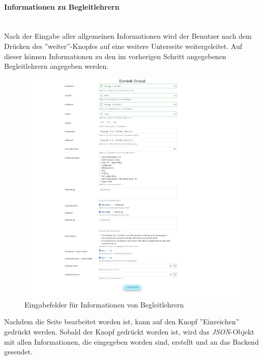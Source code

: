 \paragraph{Informationen zu Begleitlehrern}~
\label{code_submit_data}~\\
Nach der Eingabe aller allgemeinen Informationen wird der Benutzer nach dem Drücken des ''weiter''-Knopfes auf eine weitere Unterseite weitergeleitet. Auf dieser können Informationen zu den im vorherigen Schritt angegebenen Begleitlehrern angegeben werden.
\begin{figure}[H]
	\centering
	\includegraphics[width=0.7\linewidth]{images/escorts}
	\caption[Schulveranstaltung 2]{Eingabefelder für Informationen von Begleitlehrern}
	\label{fig:escorts}
\end{figure}
\newpage
Nachdem die Seite bearbeitet worden ist, kann auf den Knopf ''Einreichen'' gedrückt werden. Sobald der Knopf gedrückt worden ist, wird das \textit{JSON}-Objekt mit allen Informationen, die eingegeben worden sind, erstellt und an das Backend gesendet.
